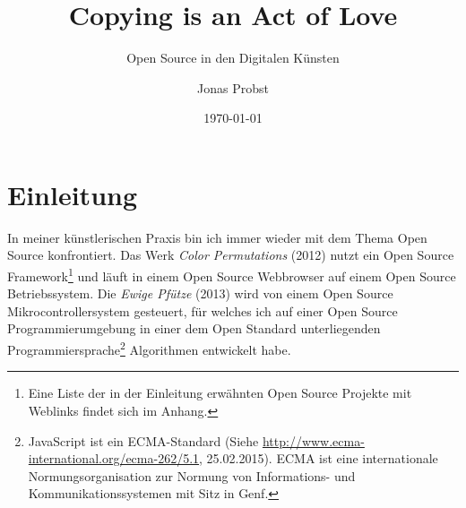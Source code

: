 \documentclass[
paper=164mm:234mm, %
pagesize, %
DIV=calc, %
10pt, %
BCOR=0mm, %
parskip=half- %
]{scrbook}
\begin{document}
\extratitle{\null \vfill
\texttt{[image: cc\_by\_sa]} \\
\footnotesize{\emph{Copying is an Act of Love. Open Source in den Digitalen Künsten} von Jonas Probst steht unter der Creative Commons Attribution-ShareAlike 4.0 International Lizenz. Die Weiterverwendung ist nur unter gleichen Bedingungen und mit Namensnennung möglich. Eine Kopie der Lizenz befindet sich unter \url{http://creativecommons.org/licenses/by-sa/4.0/}.\\
Diese Arbeit wurde in LaTeX verfasst, einer auf dem Open Source Textsatzsystem TeX beruhenden Auszeichnungssprache. Der Quellcode befindet sich unter \\
\url{http://github.com/jonasprobst/copying-is-an-act-of-love}.}
}

\title{Copying is an Act of Love}
\subtitle{Open Source in den Digitalen Künsten}
\author{Jonas Probst}

\date{\today}
\publishers{Hochschule der Künste Bern \\ MA Contemporary Arts Practice}
\lowertitleback{\normalsize{
Herzlichen Dank an\\
Andi Schoon, Rikka Feuz, Roger Villars, Micha Haarenberg und Hansjürg Wenger}}
\maketitle %


\newpage
\thispagestyle{empty}
\tableofcontents

{}
\chapter*{Einleitung}
In meiner künstlerischen Praxis bin ich immer wieder mit dem Thema Open Source konfrontiert. Das Werk \emph{Color Permutations} (2012) nutzt ein Open Source Framework\footnote{Eine Liste der in der Einleitung erwähnten Open Source Projekte mit Weblinks findet sich im Anhang.} und läuft in einem Open Source Webbrowser auf einem Open Source Betriebssystem. Die \emph{Ewige Pfütze} (2013) wird von einem Open Source Mikrocontrollersystem gesteuert, für welches ich auf einer Open Source Programmierumgebung in einer dem Open Standard unterliegenden Programmiersprache\footnote{JavaScript ist ein ECMA-Standard (Siehe \url{http://www.ecma-international.org/ecma-262/5.1}, 25.02.2015). ECMA ist eine internationale Normungsorganisation zur Normung von Informations- und Kommunikationssystemen mit Sitz in Genf.} Algorithmen entwickelt habe.
\end{document}
